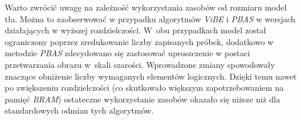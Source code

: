 Warto zwrócić uwagę na zależność wykorzystania zasobów od rozmiaru model tła. Można to zaobserwować w przypadku algorytmów \textit{ViBE} i \textit{PBAS} w wersjach działających w wyższej rozdzielczości. W~obu przypadkach model został ograniczony poprzez zredukowanie liczby zapisanych próbek, dodatkowo w metodzie \textit{PBAS} zdecydowano się zastosować uproszczenie w postaci przetwarzania obrazu w~skali szarości. Wprowadzone zmiany spowodowały znaczące obniżenie liczby wymaganych elementów logicznych. Dzięki temu nawet po zwiększeniu rozdzielczości (co skutkowało większym zapotrzebowaniem na pamięć \textit{BRAM}) ostateczne wykorzystanie zasobów okazało się niższe niż dla standardowych odmian tych algorytmów. 
